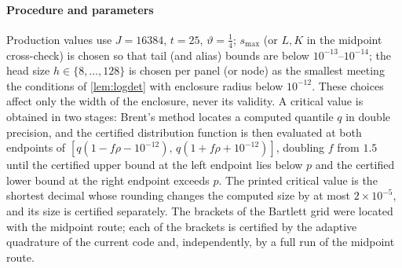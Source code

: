 \paragraph{Procedure and parameters} Production values use $J=16384$, $t=25$, $\vartheta=\frac14$; $s_{\max}$ (or $L,K$
in the midpoint cross-check) is chosen so that tail (and alias) bounds are below $10^{-13}$--$10^{-14}$; the head size
$h\in\{8,\dots,128\}$ is chosen per panel (or node) as the smallest meeting the conditions of \cref{lem:logdet} with
enclosure radius below $10^{-12}$. These choices affect only the width of the enclosure, never its validity. A critical
value is obtained in two stages: Brent's method locates a computed quantile $q$ in double precision, and the certified
distribution function is then evaluated at both endpoints of $[q(1-f\rho-10^{-12}),\,q(1+f\rho+10^{-12})]$, doubling
$f$ from $1.5$ until the certified upper bound at the left endpoint lies below $p$ and the certified lower bound at the
right endpoint exceeds $p$. The printed critical value is the shortest decimal whose rounding changes the computed size
by at most $2\times10^{-5}$, and its size is certified separately. The brackets of the Bartlett grid were located with the
midpoint route; each of the  brackets is certified by the adaptive quadrature of the current code
and, independently, by a full run of the midpoint route.

